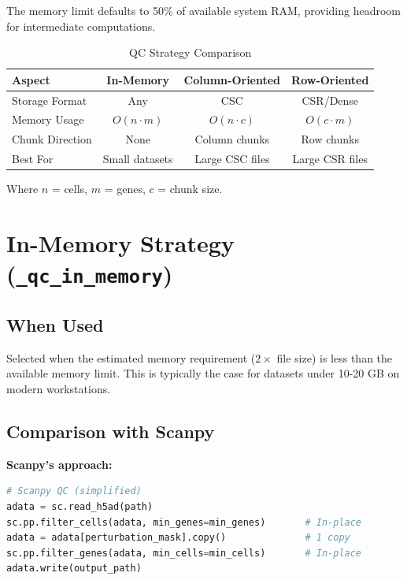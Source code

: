 \documentclass{article}
\begin{document}
The memory limit defaults to 50\% of available system RAM, providing headroom for 
intermediate computations.

\begin{table}[h]
\centering
\caption{QC Strategy Comparison}
\begin{tabular}{lccc}
\toprule
\textbf{Aspect} & \textbf{In-Memory} & \textbf{Column-Oriented} & \textbf{Row-Oriented} \\
\midrule
Storage Format & Any & CSC & CSR/Dense \\
Memory Usage & $O(n \cdot m)$ & $O(n \cdot c)$ & $O(c \cdot m)$ \\
Chunk Direction & None & Column chunks & Row chunks \\
Best For & Small datasets & Large CSC files & Large CSR files \\
\bottomrule
\end{tabular}
\label{tab:strategies}
\end{table}

Where $n$ = cells, $m$ = genes, $c$ = chunk size.

\section{In-Memory Strategy (\texttt{\_qc\_in\_memory})}

\subsection{When Used}
Selected when the estimated memory requirement ($2 \times$ file size) is less than the 
available memory limit. This is typically the case for datasets under 10-20 GB on modern 
workstations.

\subsection{Comparison with Scanpy}

\textbf{Scanpy's approach:}
\begin{lstlisting}[language=Python]
# Scanpy QC (simplified)
adata = sc.read_h5ad(path)
sc.pp.filter_cells(adata, min_genes=min_genes)       # In-place
adata = adata[perturbation_mask].copy()              # 1 copy
sc.pp.filter_genes(adata, min_cells=min_cells)       # In-place
adata.write(output_path)
\end{lstlisting}
\end{document}
